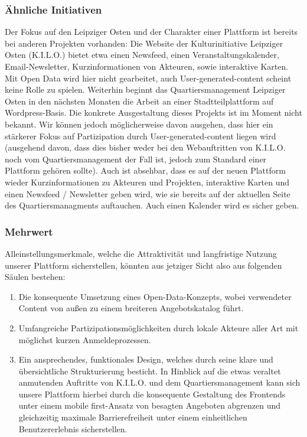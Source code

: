 \documentclass{swp}
\begin{document}
\subsubsection{\"Ahnliche Initiativen}
Der Fokus auf den Leipziger Osten und der Charakter einer Plattform ist bereits bei anderen Projekten vorhanden: Die Website der Kulturinitiative Leipziger Osten (\glqq K.I.L.O.\grqq{}) bietet etwa einen Newsfeed, einen Veranstaltungskalender, Email-Newsletter, Kurzinformationen von Akteuren, sowie interaktive Karten. Mit Open Data wird hier nicht gearbeitet, auch User-generated-content scheint keine Rolle zu spielen. Weiterhin beginnt das Quartiersmanagement Leipziger Osten in den n\"achsten Monaten die Arbeit an einer Stadtteilplattform auf Wordpress-Basis. Die konkrete Ausgestaltung dieses Projekts ist im Moment nicht bekannt. Wir k\"onnen jedoch m\"oglicherweise davon ausgehen, dass hier ein st\"arkerer Fokus auf Partizipation durch User-generated-content liegen wird (ausgehend davon, dass dies bisher weder bei den Webauftritten von K.I.L.O. noch vom Quartiersmanagement der Fall ist, jedoch zum Standard einer \glqq Plattform\grqq{} geh\"oren sollte). Auch ist absehbar, dass es auf der neuen Plattform wieder Kurzinformationen zu Akteuren und Projekten, interaktive Karten und einen Newsfeed / Newsletter geben wird, wie sie bereits auf der aktuellen Seite des Quartiersmanagments auftauchen. Auch einen Kalender wird es sicher geben.
\subsubsection{Mehrwert}
Alleinstellungsmerkmale, welche die Attraktivit\"at und langfristige Nutzung unserer Plattform sicherstellen, k\"onnten aus jetziger Sicht also aus folgenden S\"aulen bestehen: 
\begin{enumerate}
\item Die konsequente Umsetzung eines Open-Data-Konzepts, wobei verwendeter Content von au{\ss}en zu einem breiteren Angebotskatalog f\"uhrt.
\item Umfangreiche Partizipationsm\"oglichkeiten durch lokale Akteure aller Art mit m\"oglichst kurzen Anmeldeprozessen.
\item Ein ansprechendes, funktionales Design, welches durch seine klare und \"ubersichtliche Strukturierung besticht. In Hinblick auf die etwas \glqq veraltet\grqq{} anmutenden Auftritte von K.I.L.O. und dem Quartiersmanagement kann sich unsere Plattform hierbei durch die konsequente Gestaltung des Frontends unter einem \glqq mobile first\grqq{}-Ansatz von besagten Angeboten abgrenzen und gleichzeitig maximale Barrierefreiheit unter einem einheitlichen Benutzererlebnis sicherstellen.
\end{enumerate}
\end{document}
